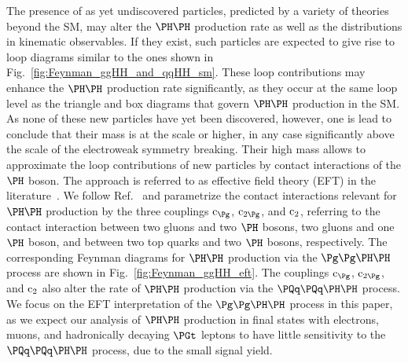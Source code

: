 The presence of as yet undiscovered particles, predicted by a variety of theories beyond the SM, may alter the $\HH$ production rate
as well as the distributions in kinematic observables.
If they exist, such particles are expected to give rise to loop diagrams similar to the ones shown in Fig.~\ref{fig:Feynman_ggHH_and_qqHH_sm}.
These loop contributions may enhance the $\HH$ production rate significantly,
as they occur at the same loop level as the triangle and box diagrams that govern $\HH$ production in the SM.
As none of these new particles have yet been discovered, however, one is lead to conclude that their mass is at the \TeV scale or higher,
in any case significantly above the scale of the electroweak symmetry breaking.
Their high mass allows to approximate the loop contributions of new particles by contact interactions of the $\PHiggs$ boson.
The approach is referred to as effective field theory (EFT) in the literature~\cite{Buchmuller:1985jz,Grzadkowski:2010es}.
We follow Ref.~\cite{Carvalho:2015ttv} and parametrize the contact interactions relevant for $\HH$ production by the three couplings $\cg$, $\cgg$, and $\text{c}_{2}$,
referring to the contact interaction between two gluons and two $\PHiggs$ bosons, two gluons and one $\PHiggs$ boson, 
and between two top quarks and two $\PHiggs$ bosons, respectively.
The corresponding Feynman diagrams for $\HH$ production via the $\ggHH$ process are shown in Fig.~\ref{fig:Feynman_ggHH_eft}.
The couplings $\cg$, $\cgg$, and $\text{c}_{2}$ also alter the rate of $\HH$ production via the $\qqHH$ process.
We focus on the EFT interpretation of the $\ggHH$ process in this paper,
as we expect our analysis of $\HH$ production in final states with electrons, muons, and hadronically decaying $\PGt$ leptons
to have little sensitivity to the $\qqHH$ process, due to the small signal yield.

